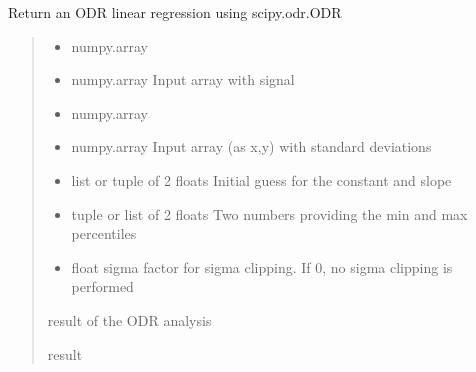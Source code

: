 \documentclass[letterpaper,10pt,english]{sphinxmanual}
\begin{document}
\begin{fulllineitems}
\label{\detokenize{api/pymusepipe:pymusepipe.util_image.regress_odr}}
\pysigstartsignatures
{}
\pysigstopsignatures
\sphinxAtStartPar
Return an ODR linear regression using scipy.odr.ODR
\begin{quote}\begin{description}
\begin{itemize}
\item {} 
\sphinxAtStartPar
{} \textendash{} numpy.array

\item {} 
\sphinxAtStartPar
{} \textendash{} numpy.array
Input array with signal

\item {} 
\sphinxAtStartPar
{} \textendash{} numpy.array

\item {} 
\sphinxAtStartPar
{} \textendash{} numpy.array
Input array (as x,y) with standard deviations

\item {} 
\sphinxAtStartPar
{} \textendash{} list or tuple of 2 floats
Initial guess for the constant and slope

\item {} 
\sphinxAtStartPar
{} \textendash{} tuple or list of 2 floats
Two numbers providing the min and max percentiles

\item {} 
\sphinxAtStartPar
{} \textendash{} float
sigma factor for sigma clipping. If 0, no sigma clipping
is performed

\end{itemize}

\sphinxAtStartPar
result of the ODR analysis

\sphinxAtStartPar
result

\end{description}\end{quote}

\end{fulllineitems}
\end{document}
